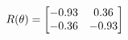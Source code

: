 \documentclass[preview]{standalone}
\begin{document}
\begin{align*}
\special{dvisvgm:raw <g id='unique000'>}R(\theta) = \begin{bmatrix}-0.93 & 0.36\\-0.36 & -0.93\end{bmatrix}\special{dvisvgm:raw </g>}
\end{align*}
\end{document}
